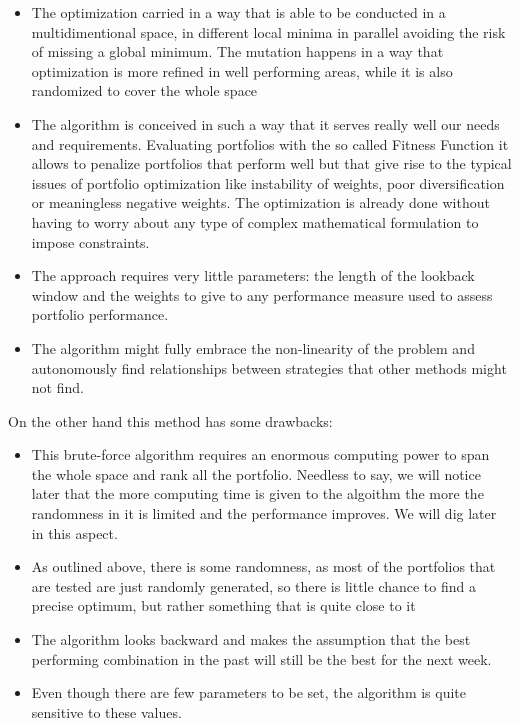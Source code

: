 \documentclass[a4paper]{article}
\begin{document}
\begin{itemize}
	\item The optimization carried in a way that is able to be conducted in a multidimentional space, in different local minima in parallel  avoiding the risk of missing a global minimum. The mutation happens in a way that optimization is more refined in well performing areas, while it is also randomized to cover the whole space
	\item The algorithm is conceived in such a way that it serves really well our needs and requirements. Evaluating portfolios with the so called Fitness Function it allows to penalize portfolios that perform well but that give rise to the typical issues of portfolio optimization like instability of weights, poor diversification or meaningless negative weights. The optimization is already done without having to worry about any type of complex mathematical formulation to impose constraints.
	\item The approach requires very little parameters: the length of the lookback window and the weights to give to any performance measure used to assess portfolio performance.
	\item The algorithm might fully embrace the non-linearity of the problem and autonomously find relationships between strategies that other methods might not find. 
\end{itemize}  

On the other hand this method has some drawbacks:

\begin{itemize}
	\item This brute-force algorithm requires an enormous computing power to span the whole space and rank all the portfolio. Needless to say, we will notice later that the more computing time is given to the algoithm the more the randomness in it is limited and the performance improves. We will dig later in this aspect. 
	\item As outlined above, there is some randomness, as most of the portfolios that are tested are just randomly generated, so there is little chance to find a precise optimum, but rather something that is quite close to it
	\item The algorithm looks backward and makes the assumption that the best performing combination in the past will still be the best for the next week.
	\item Even though there are few parameters to be set, the algorithm is quite sensitive to these values.
\end{itemize}
\end{document}
